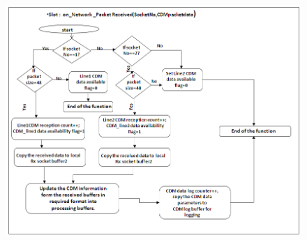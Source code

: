 \begin{figure}[H]
	\centering
	\includegraphics[width=\linewidth]{./FlowCharts/PngFlowCharts/SLOT_CDM.png}
\end{figure}

